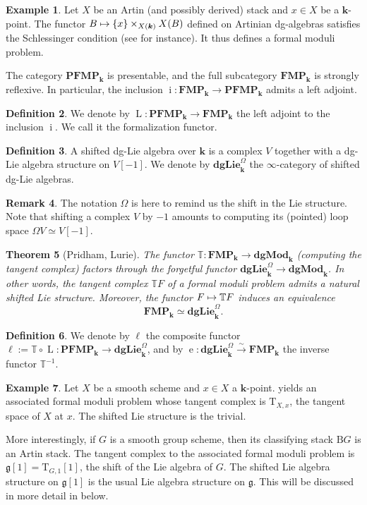 \documentclass[JEP,XML,SOM,Unicode,NoEqCountersInSection]{cedram}
\let\autoref\Cref
\newcommand\mto{\mathchoice{\longmapsto}{\mapsto}{\mapsto}{\mapsto}}
\newcommand{\isom}{\stackrel{\sim}{\longrightarrow}}
\newcounter{condition}
\newtheorem{thm}{Theorem}[subsection]
\theoremstyle{definition}
\newtheorem{df}[thm]{Definition}
\newtheorem{ex}[thm]{Example}
\newtheorem{rmq}[thm]{Remark}
\newcommand{\T}{\mathbb{T}}
\newcommand{\dgLie}{\mathbf{dgLie}}
\newcommand{\dgMod}{\mathbf{dgMod}}
\newcommand{\B}{\mathrm{B}}
\newcommand{\FMP}{\mathbf{FMP}}
\renewcommand{\k}{{\boldsymbol{k}}}
\newcommand{\e}{\operatorname{e}}
\newcommand{\incl}{\operatorname{i}}
\newcommand{\form}{\operatorname{L}}
\newcommand{\PFMP}{\mathbf{PFMP}}
\newcommand{\g}{\mathfrak{g}}
\begin{document}
\begin{ex}\label{ex:artinstacksareFMP}
Let $X$ be an Artin (and possibly derived) stack and $x \in X$ be a $\k$-point. The functor $B \mto \{ x\} \times_{X(\k)} X(B)$ defined on Artinian dg-algebras satisfies the Schlessinger condition (see \cite{toen:hagii} for instance). It thus defines a formal moduli problem.
\end{ex}

The category $\PFMP_\k$ is presentable, and the full subcategory $\FMP_\k$ is strongly reflexive. In particular, the inclusion $\incl \colon \FMP_\k \to \PFMP_\k$ admits a left adjoint.
\begin{df}
We denote by $\form \colon \PFMP_\k \to \FMP_\k$ the left adjoint to the inclusion $\incl$. We call it the formalization functor.
\end{df}

\begin{df}
A shifted dg-Lie algebra over $\k$ is a complex $V$ together with a dg-Lie algebra structure on $V[-1]$. We denote by $\dgLie_\k^{\Omega}$ the $\infty$-category of shifted dg-Lie algebras.
\end{df}

\begin{rmq}
The notation $\Omega$ is here to remind us the shift in the Lie structure. Note that shifting a complex $V$ by $-1$ amounts to computing its (pointed) loop space $\Omega V \simeq V[-1]$.
\end{rmq}

\begin{thm}[Pridham, Lurie]\label{thm:pridhamlurie}
The functor $\T \colon \FMP_\k \to \dgMod_\k$ (computing the tangent complex) factors through the forgetful functor $\dgLie_\k^\Omega \to \dgMod_\k$. In other words, the tangent complex $\T F$ of a formal moduli problem admits a natural shifted Lie structure. Moreover, the functor $F \mto \T F$ induces an equivalence
\[
\FMP_\k \simeq \dgLie_\k^{\Omega}.
\]
\end{thm}

\begin{df}
We denote by $\ell$ the composite functor $\ell := \T \circ \form \colon \PFMP_\k \to \dgLie_\k^\Omega$, and by $\e \colon \dgLie_\k^\Omega \isom \FMP_\k$ the inverse functor $\T^{-1}$.
\end{df}

\begin{ex}\label{ex:tgtcoincides}
Let $X$ be a smooth scheme and $x \in X$ a $\k$-point. \autoref{ex:artinstacksareFMP} yields an associated formal moduli problem whose tangent complex is $\mathrm T_{X,x}$, the tangent space of $X$ at $x$. The shifted Lie structure is the trivial.

More interestingly, if $G$ is a smooth group scheme, then its classifying stack $\B G$ is an Artin stack. The tangent complex to the associated formal moduli problem is $\g[1] = \mathrm T_{G, 1}[1]$, the shift of the Lie algebra of $G$. The shifted Lie algebra structure on $\g[1]$ is the usual Lie algebra structure on $\g$. This will be discussed in more detail in \autoref{sec:tracemap} below.
\end{ex}
\end{document}
